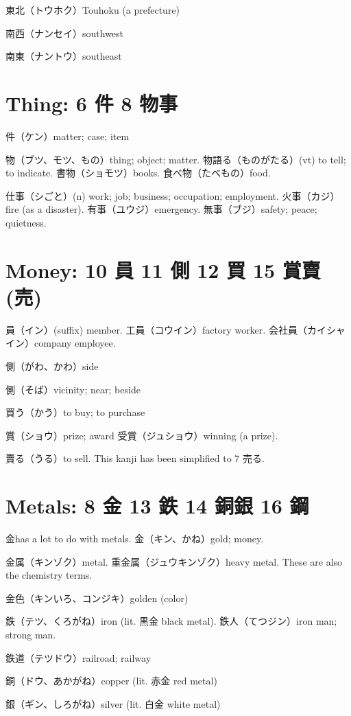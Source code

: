 東北（トウホク）Touhoku (a prefecture)

南西（ナンセイ）southwest

南東（ナントウ）southeast

\section{Thing: 6 件 8 物事}

件（ケン）matter; case; item

物（ブツ、モツ、もの）thing; object; matter.
物語る（ものがたる）(vt) to tell; to indicate.
書物（ショモツ）books.
食べ物（たべもの）food.

仕事（シごと）(n) work; job; business; occupation; employment.
火事（カジ）fire (as a disaster).
有事（ユウジ）emergency.
無事（ブジ）safety; peace; quietness.

\section{Money: 10 員 11 側 12 買 15 賞賣(売)}

員（イン）(suffix) member.
工員（コウイン）factory worker.
会社員（カイシャイン）company employee.

側（がわ、かわ）side

側（そば）vicinity; near; beside

買う（かう）to buy; to purchase

賞（ショウ）prize; award
受賞（ジュショウ）winning (a prize).

賣る（うる）to sell.
This kanji has been simplified to 7 売る.

\section{Metals: 8 金 13 鉄 14 銅銀 16 鋼}

金has a lot to do with metals.
金（キン、かね）gold; money.

金属（キンゾク）metal.
重金属（ジュウキンゾク）heavy metal.
These are also the chemistry terms.

金色（キンいろ、コンジキ）golden (color)

鉄（テツ、くろがね）iron (lit. 黒金 black metal).
鉄人（てつジン）iron man; strong man.

鉄道（テツドウ）railroad; railway

銅（ドウ、あかがね）copper (lit. 赤金 red metal)

銀（ギン、しろがね）silver (lit. 白金 white metal)

